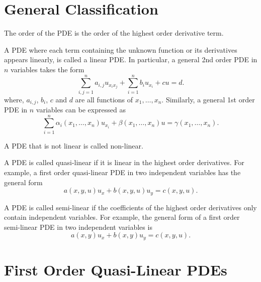 \documentclass[11pt]{penrose}
\begin{document}
\section{General Classification}

The order of the PDE is the order of the highest order derivative term.

A PDE where each term containing the unknown function or its derivatives appears linearly, is called a linear PDE. In particular, a general 2nd order PDE in $n$ variables takes the form
\begin{equation}
    \sum_{i,j=1}^{n} a_{i,j} u_{x_i x_j} + \sum_{i=1}^{n} b_i u_{x_i} + c u = d.
\end{equation}
where, $a_{i,j}$, $b_{i}$, $c$ and $d$ are all functions of $x_1, \dots, x_n$. Similarly, a general 1st order PDE in $n$ variables can be expressed as
\begin{equation}
    \sum_{i=1}^{n} \alpha_i (x_1, \dots, x_n) u_{x_i} + \beta (x_1, \dots, x_n) u = \gamma (x_1, \dots, x_n).
\end{equation}

A PDE that is not linear is called non-linear.

A PDE is called quasi-linear if it is linear in the highest order derivatives. For example, a first order quasi-linear PDE in two independent variables has the general form
\begin{equation}
    a(x,y,u) u_x + b(x,y,u) u_y = c(x,y,u).
\end{equation}

A PDE is called semi-linear if the coefficients of the highest order derivatives only contain independent variables. For example, the general form of a first order semi-linear PDE in two independent variables is
\begin{equation}
    a(x,y) u_x + b(x,y) u_y = c(x,y,u).
\end{equation}

\section{First Order Quasi-Linear PDEs}
\end{document}

